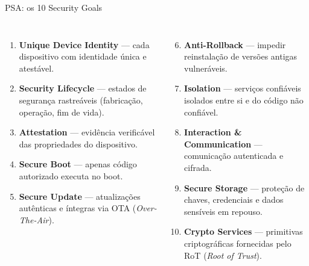 \documentclass{beamer}
\begin{document}
\begin{frame}{PSA: os 10 Security Goals}
\small
\begin{columns}[T,onlytextwidth]
\begin{enumerate}
  \item \textbf{Unique Device Identity} --- cada dispositivo com identidade única e atestável.
  \item \textbf{Security Lifecycle} --- estados de segurança rastreáveis (fabricação, operação, fim de vida).
  \item \textbf{Attestation} --- evidência verificável das propriedades do dispositivo.
  \item \textbf{Secure Boot} --- apenas código autorizado executa no boot.
  \item \textbf{Secure Update} --- atualizações autênticas e íntegras via OTA (\textit{Over-The-Air}).
\end{enumerate}

\begin{enumerate}\setcounter{enumi}{5}
  \item \textbf{Anti-Rollback} --- impedir reinstalação de versões antigas vulneráveis.
  \item \textbf{Isolation} --- serviços confiáveis isolados entre si e do código não confiável.
  \item \textbf{Interaction \& Communication} --- comunicação autenticada e cifrada.
  \item \textbf{Secure Storage} --- proteção de chaves, credenciais e dados sensíveis em repouso.
  \item \textbf{Crypto Services} --- primitivas criptográficas fornecidas pelo RoT (\textit{Root of Trust}).
\end{enumerate}
\end{columns}
\end{frame}
\end{document}
